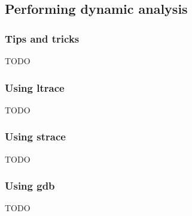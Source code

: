 \documentclass{beamer}
\begin{document}
\subsection{Performing dynamic analysis}
\begin{frame}
  \frametitle{Tips and tricks}
  \begin{center}
    TODO
  \end{center}
\end{frame}
\begin{frame}
  \frametitle{Using ltrace}
  \begin{center}
    TODO
  \end{center}
\end{frame}
\begin{frame}
  \frametitle{Using strace}
  \begin{center}
    TODO
  \end{center}
\end{frame}
\begin{frame}
  \frametitle{Using gdb}
  \begin{center}
    TODO
  \end{center}
\end{frame}
\end{document}
